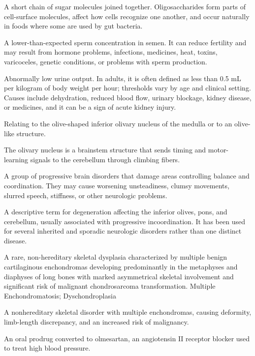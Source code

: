  A short chain of sugar molecules joined together. Oligosaccharides form parts of cell-surface molecules, affect how cells recognize one another, and occur naturally in foods where some are used by gut bacteria.

 A lower-than-expected sperm concentration in semen. It can reduce fertility and may result from hormone problems, infections, medicines, heat, toxins, varicoceles, genetic conditions, or problems with sperm production.

 Abnormally low urine output. In adults, it is often defined as less than 0.5 mL per kilogram of body weight per hour; thresholds vary by age and clinical setting. Causes include dehydration, reduced blood flow, urinary blockage, kidney disease, or medicines, and it can be a sign of acute kidney injury.

 Relating to the olive-shaped inferior olivary nucleus of the medulla or to an olive-like structure.

 The olivary nucleus is a brainstem structure that sends timing and motor-learning signals to the cerebellum through climbing fibers.

 A group of progressive brain disorders that damage areas controlling balance and coordination. They may cause worsening unsteadiness, clumsy movements, slurred speech, stiffness, or other neurologic problems.

 A descriptive term for degeneration affecting the inferior olives, pons, and cerebellum, usually associated with progressive incoordination. It has been used for several inherited and sporadic neurologic disorders rather than one distinct disease.

 A rare, non-hereditary skeletal dysplasia characterized by multiple benign cartilaginous enchondromas developing predominantly in the metaphyses and diaphyses of long bones with marked asymmetrical skeletal involvement and significant risk of malignant chondrosarcoma transformation.
\synonyms
Multiple Enchondromatosis; Dyschondroplasia

 A nonhereditary skeletal disorder with multiple enchondromas, causing deformity, limb-length discrepancy, and an increased risk of malignancy.

 An oral prodrug converted to olmesartan, an angiotensin II receptor blocker used to treat high blood pressure.

